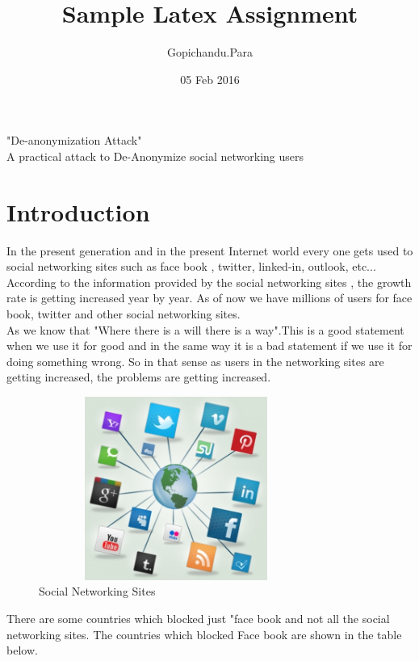 \documentclass[14pt letter paper]{article}
\title{Sample Latex Assignment}
\author{Gopichandu.Para}
\date{ 05 Feb 2016}
\begin{document}
\maketitle "De-anonymization Attack" \\A practical attack to De-Anonymize social networking users





\section{Introduction}
In the present generation and in the present Internet world every one gets used to social networking sites such as face book , twitter, linked-in, outlook, etc... \\According to the information provided by the social networking sites , the growth rate is getting increased year by year. As of now we have millions of users for face book, twitter and other social networking sites.
\\As we know that "Where there is a will there is a way".This is a good statement when we use it for good and in the same way it is a bad statement if we use it for doing something wrong. So in that sense as users in the networking sites are getting increased, the problems are getting increased. 


\begin{figure}[h]
\centering
\includegraphics[width=9cm, height=6cm]{socialnetwork.jpg}
\caption{Social Networking Sites}
\label{fig:socialnetwork}
\end{figure}

There are some countries which blocked just "face book and not all the social networking sites. The countries which blocked Face book are shown in the table below. 
\end{document}
